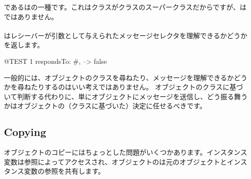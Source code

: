 \documentclass[a4paper,10pt,twoside]{book}
\begin{document}
であるはの一種です。これはクラスがクラスのスーパークラスだからですが、はではありません。

\paragraph{}
はレシーバーが引数として与えられたメッセージセレクタを理解できるかどうかを返します。

\begin{code}{@TEST}
1 respondsTo: #, --> false
\end{code}

一般的には、オブジェクトのクラスを尋ねたり、メッセージを理解できるかどうかを尋ねたりするのはいい考えではありません。
オブジェクトのクラスに基づいて判断する代わりに、単にオブジェクトにメッセージを送信し、どう振る舞うかはオブジェクトの（クラスに基づいた）決定に任せるべきです。

\subsection{Copying}

オブジェクトのコピーにはちょっとした問題がいくつかあります。インスタンス変数は参照によってアクセスされ、オブジェクトのは元のオブジェクトとインスタンス変数の参照を共有します。
\end{document}
